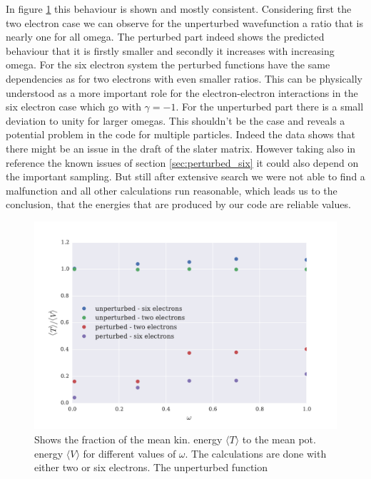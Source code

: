 In figure \ref{fig:virialtheorem} this behaviour is shown and mostly consistent. Considering first the two electron case we can observe for the unperturbed wavefunction a ratio that is nearly one for all omega. The perturbed part indeed shows the predicted behaviour that it is firstly smaller and secondly it increases with increasing omega. For the six electron system the perturbed functions have the same dependencies as for two electrons with even smaller ratios. This can be physically understood as a more important role for the electron-electron interactions in the six electron case which go with $\gamma = -1$. For the unperturbed part there is a small deviation to unity for larger omegas. This shouldn't be the case and reveals a potential problem in the code for multiple particles. Indeed the data shows that there might be an issue in the draft of the slater matrix. However taking also in reference the known issues of section \ref{sec:perturbed_six} it could also depend on the important sampling. But still after extensive search we were not able to find a malfunction and all other calculations run reasonable, which leads us to the conclusion, that the energies that are produced by our code are reliable values.  
\begin{figure}[htbp]
    \centering
    \includegraphics[scale=0.65]{virialtheorem}
    \caption{Shows the fraction of the mean kin. energy $\langle T \rangle$ to the mean pot. energy $\langle V \rangle$ for different values of $\omega$. The calculations are done with either two or six electrons. The unperturbed function}
    \label{fig:virialtheorem}
\end{figure}

